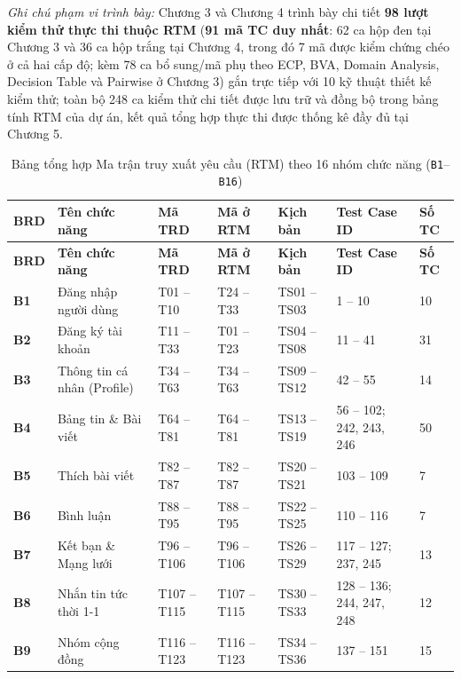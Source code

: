 \documentclass[11pt,a4paper]{article}
\begin{document}
\noindent\textit{Ghi chú phạm vi trình bày:} Chương 3 và Chương 4 trình bày chi tiết \textbf{98 lượt kiểm thử thực thi thuộc RTM} (\textbf{91 mã TC duy nhất}: 62 ca hộp đen tại Chương 3 và 36 ca hộp trắng tại Chương 4, trong đó 7 mã được kiểm chứng chéo ở cả hai cấp độ; kèm 78 ca bổ sung/mã phụ theo ECP, BVA, Domain Analysis, Decision Table và Pairwise ở Chương 3) gắn trực tiếp với 10 kỹ thuật thiết kế kiểm thử; toàn bộ 248 ca kiểm thử chi tiết được lưu trữ và đồng bộ trong bảng tính RTM của dự án, kết quả tổng hợp thực thi được thống kê đầy đủ tại Chương 5.

\begin{longtable}{|C{0.9cm}|L{3.5cm}|C{1.9cm}|C{1.9cm}|C{1.8cm}|C{3.5cm}|C{1.1cm}|}
\hline
{}
\textbf{BRD} & \textbf{Tên chức năng} & \textbf{Mã TRD} & \textbf{Mã ở RTM} & \textbf{Kịch bản} & \textbf{Test Case ID} & \textbf{Số TC} \tabularnewline
\hline
\endfirsthead
\hline
{}
\textbf{BRD} & \textbf{Tên chức năng} & \textbf{Mã TRD} & \textbf{Mã ở RTM} & \textbf{Kịch bản} & \textbf{Test Case ID} & \textbf{Số TC} \tabularnewline
\hline
\endhead
\hline
\endfoot
\hline
\caption{Bảng tổng hợp Ma trận truy xuất yêu cầu (RTM) theo 16 nhóm chức năng (\texttt{B1}--\texttt{B16})}
\endlastfoot
\textbf{B1} & Đăng nhập người dùng & T01 -- T10 & T24 -- T33 & TS01 -- TS03 & 1 -- 10 & 10 \\ \hline
\textbf{B2} & Đăng ký tài khoản & T11 -- T33 & T01 -- T23 & TS04 -- TS08 & 11 -- 41 & 31 \\ \hline
\textbf{B3} & Thông tin cá nhân (Profile) & T34 -- T63 & T34 -- T63 & TS09 -- TS12 & 42 -- 55 & 14 \\ \hline
\textbf{B4} & Bảng tin \& Bài viết & T64 -- T81 & T64 -- T81 & TS13 -- TS19 & 56 -- 102; 242, 243, 246 & 50 \\ \hline
\textbf{B5} & Thích bài viết & T82 -- T87 & T82 -- T87 & TS20 -- TS21 & 103 -- 109 & 7 \\ \hline
\textbf{B6} & Bình luận & T88 -- T95 & T88 -- T95 & TS22 -- TS25 & 110 -- 116 & 7 \\ \hline
\textbf{B7} & Kết bạn \& Mạng lưới & T96 -- T106 & T96 -- T106 & TS26 -- TS29 & 117 -- 127; 237, 245 & 13 \\ \hline
\textbf{B8} & Nhắn tin tức thời 1-1 & T107 -- T115 & T107 -- T115 & TS30 -- TS33 & 128 -- 136; 244, 247, 248 & 12 \\ \hline
\textbf{B9} & Nhóm cộng đồng & T116 -- T123 & T116 -- T123 & TS34 -- TS36 & 137 -- 151 & 15 \\ \hline

\end{longtable}
\end{document}
